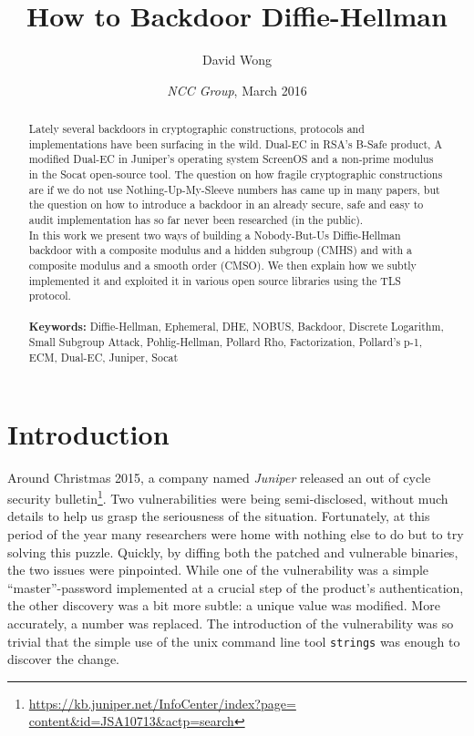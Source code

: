 \documentclass[a4paper,11pt,twocolumn]{article}
\title{How to Backdoor Diffie-Hellman}
\author{David Wong}
\date{\emph{NCC Group}, \small{March 2016}}
\begin{document}
\maketitle
\renewcommand{\abstractname}{Abstract}
\begin{abstract}
Lately several backdoors in cryptographic constructions, protocols and implementations have been surfacing in the wild. Dual-EC in RSA's B-Safe product, A modified Dual-EC in Juniper's operating system ScreenOS and a non-prime modulus in the Socat open-source tool. The question on how fragile cryptographic constructions are if we do not use Nothing-Up-My-Sleeve numbers has came up in many papers, but the question on how to introduce a backdoor in an already secure, safe and easy to audit implementation has so far never been researched (in the public).\\
In this work we present two ways of building a Nobody-But-Us Diffie-Hellman backdoor with a composite modulus and a hidden subgroup (CMHS) and with a composite modulus and a smooth order (CMSO). We then explain how we subtly implemented it and exploited it in various open source libraries using the TLS protocol.\\
\\
\textbf{Keywords:} Diffie-Hellman, Ephemeral, DHE, NOBUS, Backdoor, Discrete Logarithm, Small Subgroup Attack, Pohlig-Hellman, Pollard Rho, Factorization, Pollard's p-1, ECM, Dual-EC, Juniper, Socat\\

\end{abstract}
\section{Introduction}\label{introduction}

Around Christmas 2015, a company named \emph{Juniper} released an out of cycle security bulletin\footnote{\href{https://kb.juniper.net/InfoCenter/index?page=content&id=JSA10713&actp=search}{https://kb.juniper.net/InfoCenter/index?page=\\content&id=JSA10713&actp=search}}. Two vulnerabilities were being semi-disclosed, without much details to help us grasp the seriousness of the situation. Fortunately, at this period of the year many researchers were home with nothing else to do but to try solving this puzzle. Quickly, by diffing both the patched and vulnerable binaries, the two issues were pinpointed. While one of the vulnerability was a simple ``master''-password implemented at a crucial step of the product's authentication, the other discovery was a bit more subtle: a unique value was modified. More accurately, a number was replaced. The introduction of the vulnerability was so trivial that the simple use of the unix command line tool \texttt{strings} was enough to discover the change.
\end{document}
